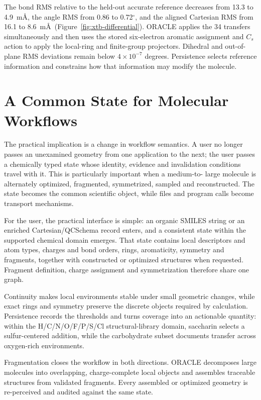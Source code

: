 \documentclass[journal=jctcce,manuscript=article]{achemso}
\begin{document}
The bond RMS relative to the held-out accurate reference decreases from 13.3 to
4.9~m\AA, the angle RMS from 0.86 to 0.72$^\circ$, and the aligned
Cartesian RMS from 16.1 to 8.6~m\AA\
(Figure~\ref{fig:xtb-differential}).  ORACLE applies the 34 transfers
simultaneously and then uses the stored six-electron aromatic assignment and
$C_s$ action to apply the local-ring and finite-group projectors.  Dihedral
and out-of-plane RMS deviations remain below
$4\times10^{-7}$ degrees.  Persistence selects reference information and
constrains how that information may modify the molecule.

\section{A Common State for Molecular Workflows}

The practical implication is a change in workflow semantics.  A user no
longer passes an unexamined geometry from one application to the next; the
user passes a chemically typed state whose identity, evidence and invalidation
conditions travel with it.  This is particularly important when a medium-to-
large molecule is alternately optimized, fragmented, symmetrized, sampled and
reconstructed.  The state becomes the common scientific object, while files
and program calls become transport mechanisms.

For the user, the practical interface is simple: an organic SMILES
string or an enriched Cartesian/QCSchema record enters, and a consistent state within the supported chemical
domain emerges.  That state contains local descriptors and atom types, charges and bond
orders, rings, aromaticity, symmetry and fragments, together with constructed
or optimized structures when requested.  Fragment definition, charge
assignment and symmetrization therefore share one graph.

Continuity makes local environments stable under small geometric changes,
while exact rings and symmetry preserve the discrete objects required by
calculation.  Persistence records the thresholds and turns coverage into an
actionable quantity: within the H/C/N/O/F/P/S/Cl structural-library domain,
saccharin selects a sulfur-centered addition, while the carbohydrate subset
documents transfer across oxygen-rich environments.

Fragmentation closes the workflow in both directions.  ORACLE decomposes
large molecules into overlapping, charge-complete local objects and assembles
traceable structures from validated fragments.  Every assembled or optimized
geometry is re-perceived and audited against the same state.
\end{document}
